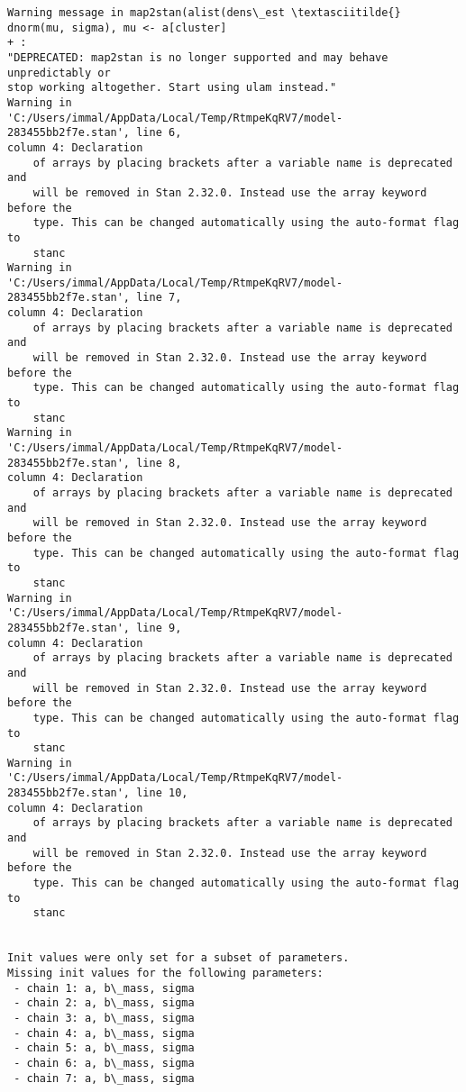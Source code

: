 \documentclass[11pt]{article}
\begin{document}
    \begin{Verbatim}[commandchars=\\\{\}]
Warning message in map2stan(alist(dens\_est \textasciitilde{} dnorm(mu, sigma), mu <- a[cluster]
+ :
"DEPRECATED: map2stan is no longer supported and may behave unpredictably or
stop working altogether. Start using ulam instead."
Warning in
'C:/Users/immal/AppData/Local/Temp/RtmpeKqRV7/model-283455bb2f7e.stan', line 6,
column 4: Declaration
    of arrays by placing brackets after a variable name is deprecated and
    will be removed in Stan 2.32.0. Instead use the array keyword before the
    type. This can be changed automatically using the auto-format flag to
    stanc
Warning in
'C:/Users/immal/AppData/Local/Temp/RtmpeKqRV7/model-283455bb2f7e.stan', line 7,
column 4: Declaration
    of arrays by placing brackets after a variable name is deprecated and
    will be removed in Stan 2.32.0. Instead use the array keyword before the
    type. This can be changed automatically using the auto-format flag to
    stanc
Warning in
'C:/Users/immal/AppData/Local/Temp/RtmpeKqRV7/model-283455bb2f7e.stan', line 8,
column 4: Declaration
    of arrays by placing brackets after a variable name is deprecated and
    will be removed in Stan 2.32.0. Instead use the array keyword before the
    type. This can be changed automatically using the auto-format flag to
    stanc
Warning in
'C:/Users/immal/AppData/Local/Temp/RtmpeKqRV7/model-283455bb2f7e.stan', line 9,
column 4: Declaration
    of arrays by placing brackets after a variable name is deprecated and
    will be removed in Stan 2.32.0. Instead use the array keyword before the
    type. This can be changed automatically using the auto-format flag to
    stanc
Warning in
'C:/Users/immal/AppData/Local/Temp/RtmpeKqRV7/model-283455bb2f7e.stan', line 10,
column 4: Declaration
    of arrays by placing brackets after a variable name is deprecated and
    will be removed in Stan 2.32.0. Instead use the array keyword before the
    type. This can be changed automatically using the auto-format flag to
    stanc


Init values were only set for a subset of parameters.
Missing init values for the following parameters:
 - chain 1: a, b\_mass, sigma
 - chain 2: a, b\_mass, sigma
 - chain 3: a, b\_mass, sigma
 - chain 4: a, b\_mass, sigma
 - chain 5: a, b\_mass, sigma
 - chain 6: a, b\_mass, sigma
 - chain 7: a, b\_mass, sigma


    \end{Verbatim}
\end{document}
